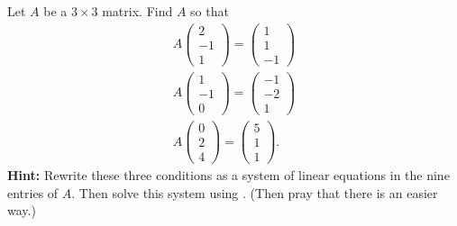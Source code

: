 \documentclass{ximera}
\begin{document}
\begin{exercise} \label{c4.1.12}
Let $A$ be a $3\times 3$ matrix.  Find $A$ so that
\begin{eqnarray*}
A\left(\begin{array}{r} 2 \\ -1 \\ 1 \end{array}\right) =
\left(\begin{array}{r} 1 \\ 1  \\ -1 \end{array}\right) \\
A\left(\begin{array}{r} 1 \\ -1 \\ 0 \end{array}\right) =
\left(\begin{array}{r} -1 \\ -2 \\ 1 \end{array}\right)\\
A\left(\begin{array}{r} 0 \\ 2 \\ 4 \end{array}\right) =
\left(\begin{array}{r} 5 \\ 1 \\ 1 \end{array}\right).
\end{eqnarray*}
{\bf Hint:} Rewrite these three conditions as a system of linear
equations in the nine entries of $A$.  Then solve this system
using \Matlabp.  (Then pray that there is an easier way.)
\end{exercise}
\end{document}
